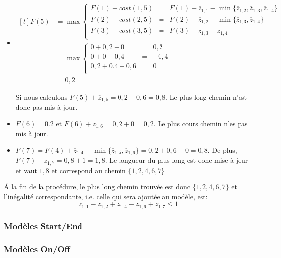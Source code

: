 \begin{ex}
\begin{itemize}
\item $\begin{aligned}[t] 
    F(5) &=  \max \left\{
        \begin{array}{lcl}
          F(1) + cost (1,5) & = & F(1) + \overline{z}_{1,1}  -
                                  \min\{\overline{z}_{1,2},\overline{z}_{1,3},\overline{z}_{1,4}\} 
          \\ 
          F(2) + cost (2,5) &= & F(2) + \overline{z}_{1,2} -
                             \min\{\overline{z}_{1,3}, \overline{z}_{1,4}\}\\
          F(3) + cost (3,5) &= & F(3) + \overline{z}_{1,3} -
                             \overline{z}_{1,4} \\
        \end{array} \right.\\
      &=  \max \left\{ 
        \begin{array}{lcl}
          0 + 0,2 - 0 &=& 0,2 \\
          0 + 0 - 0,4 &= &-0,4 \\
          0,2 + 0.4 - 0,6 &= & 0 \\ 
        \end{array} \right.\\
    &=  0,2
  \end{aligned}$

  Si nous calculons $F(5)+\overline{z}_{1,5}=0,2+0,6=0,8$. Le plus
  long chemin n'est donc pas mis à jour. 

\item $F(6)= 0.2$ et $F(6)+\overline{z}_{1,6}=0,2+0=0,2$. Le plus cours 
  chemin n'es pas mis à jour. 
\item $F(7) = F(4) +\overline{z}_{1,4} -
  \min\{\overline{z}_{1,5},\overline{z}_{1,6}\}= 0,2 + 0,6 - 0 =
  0,8$. De plus, $F(7)+\overline{z}_{1,7}=0,8+1=1,8$. Le longueur du
  plus long est donc mise à jour et vaut $1,8$ et correspond au chemin $\{1,2,4,6,7\}$
\end{itemize}

{\'A} la fin de la procédure, le plus long chemin trouvée est donc
$\{1,2,4,6,7\}$ et l'inégalité correspondante, i.e. celle qui sera
ajoutée au modèle, est:
\[  z_{1,1} - z_{1,2} + z_{1,4} - z_{1,6} + z_{1,7} \le 1  \]
\end{ex}  


\subsubsection{Modèles Start/End}

\subsubsection{Modèles On/Off}







